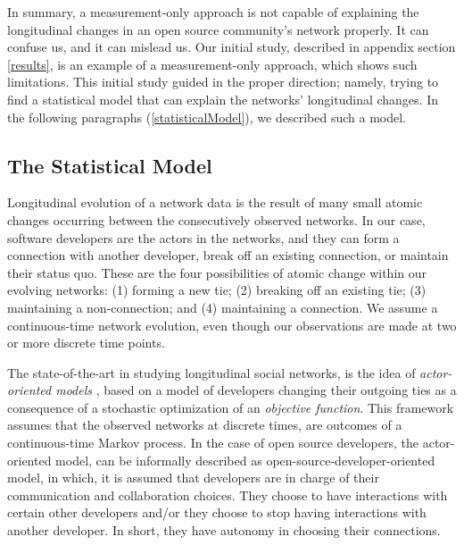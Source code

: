 \documentclass[12pt,letterpaper]{gthesis2}  %
\begin{document}
In summary, a measurement-only approach is not capable of explaining the longitudinal changes in an open source community's network properly. It can confuse us, and it can mislead us. Our initial study, described in appendix section \ref{results}, is an example of a measurement-only approach, which shows such limitations. This initial study guided in the proper direction; namely, trying to find a statistical model that can explain the networks' longitudinal changes. In the following paragraphs (\ref{statisticalModel}), we described such a model.  

%

\subsection*{The Statistical Model}
\label{statisticalModel}

Longitudinal evolution of a network data is the result of many small atomic changes occurring between the consecutively observed networks. In our case, software developers are the actors in the networks, and they can form a connection with another developer, break off an existing connection, or maintain their status quo. These are the four possibilities of atomic change within our evolving networks: (1) forming a new tie; (2) breaking off an existing tie; (3) maintaining a non-connection; and (4) maintaining a connection. We assume a continuous-time network evolution, even though our observations are made at two or more discrete time points. 

The state-of-the-art in studying longitudinal social networks, is the idea of \textit{actor-oriented models} \cite{Snijders2010}, based on a model of developers changing their outgoing ties as a consequence of a stochastic optimization of an \textit{objective function}. This framework assumes that the observed networks at discrete times, are outcomes of a continuous-time Markov process. In the case of open source developers, the actor-oriented model, can be informally described as open-source-developer-oriented model, in which, it is assumed that developers are in charge of their communication and collaboration choices. They choose to have interactions with certain other developers and/or they choose to stop having interactions with another developer. In short, they have autonomy in choosing their connections.
\end{document}

